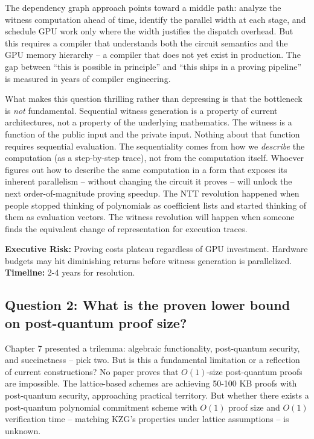 \documentclass[
  11pt,
  openany]{report}
\renewcommand{\textbf}[1]{{\bfseries\color{MidnightBold}#1}}
\begin{document}
The dependency graph approach points toward a middle path: analyze the witness
computation ahead of time, identify the parallel width at each stage, and
schedule GPU work only where the width justifies the dispatch overhead. But this
requires a compiler that understands both the circuit semantics and the GPU
memory hierarchy -- a compiler that does not yet exist in production. The gap
between ``this is possible in principle'' and ``this ships in a proving
pipeline'' is measured in years of compiler engineering.

What makes this question thrilling rather than depressing is that the bottleneck
is \emph{not} fundamental. Sequential witness generation is a property of
current architectures, not a property of the underlying mathematics. The witness
is a function of the public input and the private input. Nothing about that
function requires sequential evaluation. The sequentiality comes from how we
\emph{describe} the computation (as a step-by-step trace), not from the
computation itself. Whoever figures out how to describe the same computation in
a form that exposes its inherent parallelism -- without changing the circuit it
proves -- will unlock the next order-of-magnitude proving speedup. The NTT
revolution happened when people stopped thinking of polynomials as coefficient
lists and started thinking of them as evaluation vectors. The witness revolution
will happen when someone finds the equivalent change of representation for
execution traces.

\textbf{Executive Risk:} Proving costs plateau regardless of GPU investment.
Hardware budgets may hit diminishing returns before witness generation is
parallelized. \textbf{Timeline:} 2-4 years for resolution.

\subsection{Question 2: What is the proven lower bound on post-quantum proof
size?}\label{question-2-what-is-the-proven-lower-bound-on-post-quantum-proof-size}

Chapter 7 presented a trilemma: algebraic functionality, post-quantum security,
and succinctness -- pick two. But is this a fundamental limitation or a
reflection of current constructions? No paper proves that \(O(1)\)-size
post-quantum proofs are impossible. The lattice-based schemes are achieving
50-100 KB proofs with post-quantum security, approaching practical territory.
But whether there exists a post-quantum polynomial commitment scheme with
\(O(1)\) proof size and \(O(1)\) verification time -- matching KZG's properties
under lattice assumptions -- is unknown.
\end{document}

